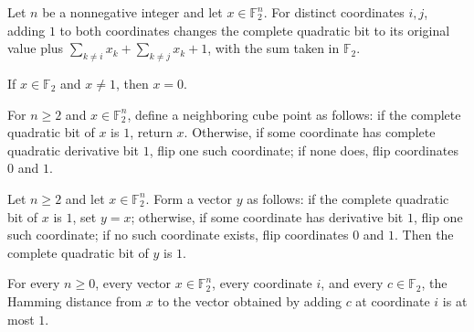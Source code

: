 \begin{theorem}
\label{FABL.completeQuadraticBit_add_two_single}
\leanok
{}
Let $n$ be a nonnegative integer and let $x\in\mathbb{F}_2^n$. For distinct coordinates
$i,j$, adding $1$ to both coordinates changes the complete quadratic bit to its original
value plus $\sum_{k\ne i}x_k+\sum_{k\ne j}x_k+1$, with the sum taken in $\mathbb{F}_2$.
\end{theorem}

\begin{theorem}
\leanok
{}
If $x\in\mathbb F_2$ and $x\ne1$, then $x=0$.
\end{theorem}

\begin{definition}
\label{FABL.completeQuadraticFlipNeighborBinary}
\leanok
{}
For $n\ge 2$ and $x\in\mathbb F_2^n$, define a neighboring cube point as follows: if the
complete quadratic bit of $x$ is $1$, return $x$. Otherwise, if some coordinate has
complete quadratic derivative bit $1$, flip one such coordinate; if none does, flip
coordinates $0$ and $1$.
\end{definition}

\begin{theorem}
\label{FABL.completeQuadraticFlipNeighborBinary_is_one}
\leanok
{}
Let $n\ge 2$ and let $x\in\mathbb{F}_2^n$. Form a vector $y$ as follows: if the complete
quadratic bit of $x$ is $1$, set $y=x$; otherwise, if some coordinate has derivative bit
$1$, flip one such coordinate; if no such coordinate exists, flip coordinates $0$ and
$1$. Then the complete quadratic bit of $y$ is $1$.
\end{theorem}

\begin{theorem}
\label{FABL.hammingDist_add_single_le_one}
\leanok
{}
For every $n\ge 0$, every vector $x\in\mathbb F_2^n$, every coordinate $i$, and every
$c\in\mathbb F_2$, the Hamming distance from $x$ to the vector obtained by adding $c$ at
coordinate $i$ is at most $1$.
\end{theorem}

